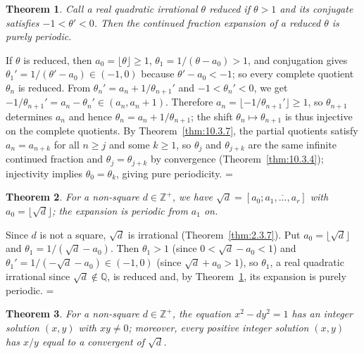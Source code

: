 \documentclass[11pt]{article}
\makeatletter
\let\nt@closedisplay\]
\def\nt@guardedclose{\@ifnextchar\par{\nt@closeafterpar}{\@ifnextchar\end{\postdisplaypenalty\@M\nt@closedisplay}{\nt@closedisplay}}}
\def\nt@closeafterpar\par{\@ifnextchar\par{\nt@closeafterpar}{\@ifnextchar\end{\postdisplaypenalty\@M\nt@closedisplay\par}{\nt@closedisplay\par}}}
\renewenvironment{proof}[1][\proofname]{\par
  \pushQED{\qed}\normalfont\topsep\medskipamount\edef\nt@afterproof{\@endparpenalty=\the\@endparpenalty\relax}\@beginparpenalty\@M\@endparpenalty\@M\let\]\nt@guardedclose\trivlist\item[]\textit{#1\@addpunct{.}} \ignorespaces}{\ifvmode\addpenalty\@M\fi\popQED\nt@afterproof\endtrivlist\@endpefalse}
\theoremstyle{ntstyle}
\newtheorem{theorem}{Theorem}[subsection]
\makeatother
\begin{document}
\begin{theorem}\label{thm:10.3.8} Call a real quadratic irrational $\theta$ reduced if
  $\theta>1$ and its conjugate satisfies $-1<\theta'<0$. Then the continued fraction expansion
  of a reduced $\theta$ is purely periodic.

\end{theorem}

\begin{proof} If $\theta$ is reduced, then
  $a_0=\lfloor\theta\rfloor\ge1$, $\theta_1=1/(\theta-a_0)>1$, and
  conjugation gives $\theta_1'=1/(\theta'-a_0)\in(-1,0)$ because
  $\theta'-a_0<-1$; so every complete quotient $\theta_n$ is reduced.
  From $\theta_n'=a_n+1/\theta_{n+1}'$ and $-1<\theta_n'<0$,
  we get $-1/\theta_{n+1}'=a_n-\theta_n'\in(a_n,a_n+1)$.
  Therefore $a_n=\lfloor-1/\theta_{n+1}'\rfloor\ge1$, so
  $\theta_{n+1}$ determines $a_n$ and hence
  $\theta_n=a_n+1/\theta_{n+1}$; the shift
  $\theta_n\mapsto\theta_{n+1}$ is thus injective on the complete
  quotients. By Theorem~\ref{thm:10.3.7}, the partial quotients satisfy
  $a_n=a_{n+k}$ for all $n\ge j$ and some $k\ge1$, so $\theta_j$ and
  $\theta_{j+k}$ are the same infinite continued fraction and
  $\theta_j=\theta_{j+k}$ by convergence (Theorem~\ref{thm:10.3.4});
  injectivity implies $\theta_0=\theta_k$, giving pure
  periodicity.
\end{proof}

\begin{theorem}\label{thm:10.3.9} For a
  non-square $d\in\mathbb{Z}^+$, we have $\sqrt {d}=[a_0;\overline{a_1,\ldots,a_r}]$ with $a_0=\lfloor\sqrt{d}\rfloor$;
  the expansion is periodic from $a_1$ on.

\end{theorem}

\begin{proof} Since $d$ is not a square, $\sqrt{d}$ is irrational
  (Theorem~\ref{thm:2.3.7}). Put $a_0=\lfloor\sqrt{d}\rfloor$ and
  $\theta_1=1/(\sqrt{d}-a_0)$. Then $\theta_1>1$ (since $0<\sqrt {d}-a_0<1$) and
  $\theta_1'=1/(-\sqrt{d}-a_0)\in(-1,0)$ (since $\sqrt {d}+a_0>1$), so $\theta_1$, a real quadratic irrational
  since $\sqrt d\notin\mathbb{Q}$, is reduced and, by Theorem~\ref{thm:10.3.8}, its expansion is purely
  periodic.
\end{proof}

\begin{theorem}\label{thm:10.3.10}
  For a non-square $d\in\mathbb{Z}^+$, the equation $x^2-dy^2=1$ has an integer solution
  $(x,y)$ with $xy\neq0$; moreover, every positive integer solution $(x,y)$ has $x/y$ equal
  to a convergent of $\sqrt{d}$.

\end{theorem}
\end{document}
